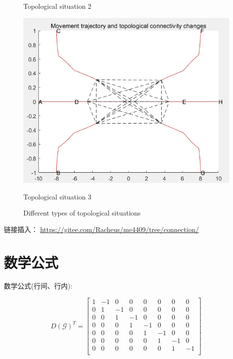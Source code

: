 \documentclass[12pt]{ctexart}
\begin{document}
\begin{figure}[h]
\begin{minipage}{0.315\linewidth}
		\centerline{Topological situation 2}
	\end{minipage}
	\begin{minipage}{0.32\linewidth}
		\vspace{3pt}
		\centerline{\includegraphics[width=\textwidth]{Image/type3.png}}
	 
		\centerline{Topological situation 3}
	\end{minipage}
 
	\caption{Different types of topological situations}

\end{figure}

链接插入：
\href{https://gitee.com/Racheus/me4409/tree/connection/}{https://gitee.com/Racheus/me4409/tree/connection/}

\newpage

\section{数学公式}
数学公式(行间、行内):

\begin{equation*}
    D(\mathcal{G})^T=\begin{bmatrix}
        1 & -1 & 0 & 0 & 0 & 0 & 0 & 0\\
        0 & 1 & -1 & 0 & 0 & 0 & 0 & 0\\
        0 & 0 & 1 & -1 & 0 & 0 & 0 & 0\\
        0 & 0 & 0 & 1 & -1 & 0 & 0 & 0\\
        0 & 0 & 0 & 0 & 1 & -1 & 0 & 0\\
        0 & 0 & 0 & 0 & 0 & 1 & -1 & 0\\
        0 & 0 & 0 & 0 & 0 & 0 & 1 & -1\\
    \end{bmatrix}
\end{equation*}
\end{document}
